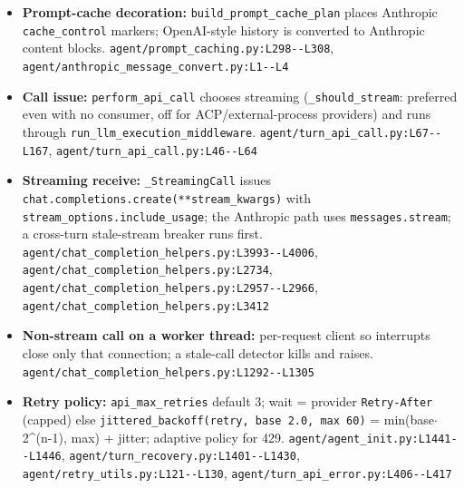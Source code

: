 \begin{itemize}
\item \textbf{Prompt-cache decoration:} \texttt{build\_\allowbreak{}prompt\_\allowbreak{}cache\_\allowbreak{}plan} places Anthropic \texttt{cache\_\allowbreak{}control} markers; OpenAI-style history is converted to Anthropic content blocks. \texttt{agent/\allowbreak{}prompt\_\allowbreak{}caching.\allowbreak{}py:\allowbreak{}L298-\allowbreak{}-\allowbreak{}L308}, \texttt{agent/\allowbreak{}anthropic\_\allowbreak{}message\_\allowbreak{}convert.\allowbreak{}py:\allowbreak{}L1-\allowbreak{}-\allowbreak{}L4}
\item \textbf{Call issue:} \texttt{perform\_\allowbreak{}api\_\allowbreak{}call} chooses streaming (\texttt{\_\allowbreak{}should\_\allowbreak{}stream}: preferred even with no consumer, off for ACP/external-process providers) and runs through \texttt{run\_\allowbreak{}llm\_\allowbreak{}execution\_\allowbreak{}middleware}. \texttt{agent/\allowbreak{}turn\_\allowbreak{}api\_\allowbreak{}call.\allowbreak{}py:\allowbreak{}L67-\allowbreak{}-\allowbreak{}L167}, \texttt{agent/\allowbreak{}turn\_\allowbreak{}api\_\allowbreak{}call.\allowbreak{}py:\allowbreak{}L46-\allowbreak{}-\allowbreak{}L64}
\item \textbf{Streaming receive:} \texttt{\_\allowbreak{}StreamingCall} issues \texttt{chat.\allowbreak{}completions.\allowbreak{}create(\allowbreak{}**stream\_\allowbreak{}kwargs)} with \texttt{stream\_\allowbreak{}options.\allowbreak{}include\_\allowbreak{}usage}; the Anthropic path uses \texttt{messages.\allowbreak{}stream}; a cross-turn stale-stream breaker runs first. \texttt{agent/\allowbreak{}chat\_\allowbreak{}completion\_\allowbreak{}helpers.\allowbreak{}py:\allowbreak{}L3993-\allowbreak{}-\allowbreak{}L4006}, \texttt{agent/\allowbreak{}chat\_\allowbreak{}completion\_\allowbreak{}helpers.\allowbreak{}py:\allowbreak{}L2734}, \texttt{agent/\allowbreak{}chat\_\allowbreak{}completion\_\allowbreak{}helpers.\allowbreak{}py:\allowbreak{}L2957-\allowbreak{}-\allowbreak{}L2966}, \texttt{agent/\allowbreak{}chat\_\allowbreak{}completion\_\allowbreak{}helpers.\allowbreak{}py:\allowbreak{}L3412}
\item \textbf{Non-stream call on a worker thread:} per-request client so interrupts close only that connection; a stale-call detector kills and raises. \texttt{agent/\allowbreak{}chat\_\allowbreak{}completion\_\allowbreak{}helpers.\allowbreak{}py:\allowbreak{}L1292-\allowbreak{}-\allowbreak{}L1305}
\item \textbf{Retry policy:} \texttt{api\_\allowbreak{}max\_\allowbreak{}retries} default 3; wait = provider \texttt{Retry-\allowbreak{}After} (capped) else \texttt{jittered\_\allowbreak{}backoff(\allowbreak{}retry, base 2.\allowbreak{}0, max 60)} = min(base$\cdot$2\textasciicircum{}(n-1), max) + jitter; adaptive policy for 429. \texttt{agent/\allowbreak{}agent\_\allowbreak{}init.\allowbreak{}py:\allowbreak{}L1441-\allowbreak{}-\allowbreak{}L1446}, \texttt{agent/\allowbreak{}turn\_\allowbreak{}recovery.\allowbreak{}py:\allowbreak{}L1401-\allowbreak{}-\allowbreak{}L1430}, \texttt{agent/\allowbreak{}retry\_\allowbreak{}utils.\allowbreak{}py:\allowbreak{}L121-\allowbreak{}-\allowbreak{}L130}, \texttt{agent/\allowbreak{}turn\_\allowbreak{}api\_\allowbreak{}error.\allowbreak{}py:\allowbreak{}L406-\allowbreak{}-\allowbreak{}L417}

\end{itemize}
